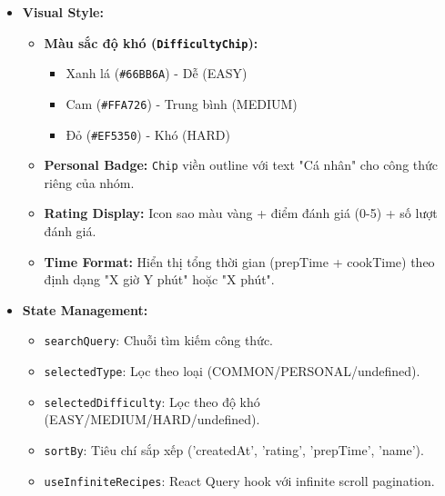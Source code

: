 \begin{itemize}
        \begin{itemize}
            \item \textbf{User Input:} \texttt{Searchbar} xử lý \texttt{onChangeText} để lọc công thức theo thời gian thực.
            \item \textbf{Filter Menus:} Nhấn vào \texttt{Chip} mở \texttt{Menu} dropdown với các tùy chọn lọc.
            \item \textbf{Infinite Scroll:} \texttt{FlatList} gọi \texttt{fetchNextPage()} khi scroll đến cuối danh sách.
            \item \textbf{Navigation:} Nhấn vào \texttt{RecipeCard} gọi \texttt{onRecipePress(recipeId)} để xem chi tiết.
            \item \textbf{Delete Action:} Nhấn nút xóa hiển thị \texttt{Alert.alert} xác nhận trước khi gọi \texttt{deleteRecipeMutation}.
            \item \textbf{Pull-to-refresh:} \texttt{RefreshControl} cho phép kéo xuống để reload danh sách.
        \end{itemize}
    \item \textbf{Visual Style:}
        \begin{itemize}
            \item \textbf{Màu sắc độ khó (\texttt{DifficultyChip}):}
                \begin{itemize}
                    \item Xanh lá (\texttt{\#66BB6A}) - Dễ (EASY)
                    \item Cam (\texttt{\#FFA726}) - Trung bình (MEDIUM)
                    \item Đỏ (\texttt{\#EF5350}) - Khó (HARD)
                \end{itemize}
            \item \textbf{Personal Badge:} \texttt{Chip} viền outline với text "Cá nhân" cho công thức riêng của nhóm.
            \item \textbf{Rating Display:} Icon sao màu vàng + điểm đánh giá (0-5) + số lượt đánh giá.
            \item \textbf{Time Format:} Hiển thị tổng thời gian (prepTime + cookTime) theo định dạng "X giờ Y phút" hoặc "X phút".
        \end{itemize}
    \item \textbf{State Management:}
        \begin{itemize}
            \item \texttt{searchQuery}: Chuỗi tìm kiếm công thức.
            \item \texttt{selectedType}: Lọc theo loại (COMMON/PERSONAL/undefined).
            \item \texttt{selectedDifficulty}: Lọc theo độ khó (EASY/MEDIUM/HARD/undefined).
            \item \texttt{sortBy}: Tiêu chí sắp xếp ('createdAt', 'rating', 'prepTime', 'name').
            \item \texttt{useInfiniteRecipes}: React Query hook với infinite scroll pagination.
        \end{itemize}
\end{itemize}

